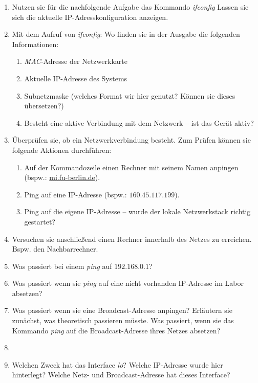 \documentclass[paper=a4,fontsize=11pt]{scrartcl}%
\numberwithin{equation}{section}
\begin{document}
\begin{enumerate}
	\item Nutzen sie für die nachfolgende Aufgabe das Kommando \emph{ifconfig} Lassen sie sich die aktuelle IP-Adresskonfiguration anzeigen.
	\item Mit dem Aufruf von \emph{ifconfig}: Wo finden sie in der Ausgabe die folgenden Informationen:
	\begin{enumerate}
		\item \emph{MAC}-Adresse der Netzwerkkarte
		\item Aktuelle IP-Adresse des Systems
		\item Subnetzmaske (welches Format wir hier genutzt? Können sie dieses übersetzen?)
		\item Besteht eine aktive Verbindung mit dem Netzwerk -- ist das Gerät aktiv?
	\end{enumerate}
	\item Überprüfen sie, ob ein Netzwerkverbindung besteht. Zum Prüfen können sie folgende Aktionen durchführen:
	\begin{enumerate}
		\item Auf der Kommandozeile einen Rechner mit seinem Namen anpingen (bspw.: \url{mi.fu-berlin.de}).
		\item Ping auf eine IP-Adresse (bspw.: $160.45.117.199$).
		\item Ping auf die eigene IP-Adresse -- wurde der lokale Netzwerkstack richtig gestartet?
	\end{enumerate}
	\item Versuchen sie anschließend einen Rechner innerhalb des Netzes zu erreichen. Bspw. den Nachbarrechner.
	\item Was passiert bei einem \emph{ping} auf $192.168.0.1$?
	\item Was passiert wenn sie \emph{ping} auf eine nicht vorhanden IP-Adresse im  Labor absetzen?
	\item Was passiert wenn sie eine Broadcast-Adresse anpingen? Erläutern sie zunächst, was theoretisch passieren müsste. Was passiert, wenn sie das Kommando \emph{ping} auf die Broadcast-Adresse ihres Netzes absetzen?
	\item 
	\item Welchen Zweck hat das Interface \emph{lo}? Welche IP-Adresse wurde hier hinterlegt? Welche Netz- und Broadcast-Adresse hat dieses Interface?
\end{enumerate}
\end{document}
